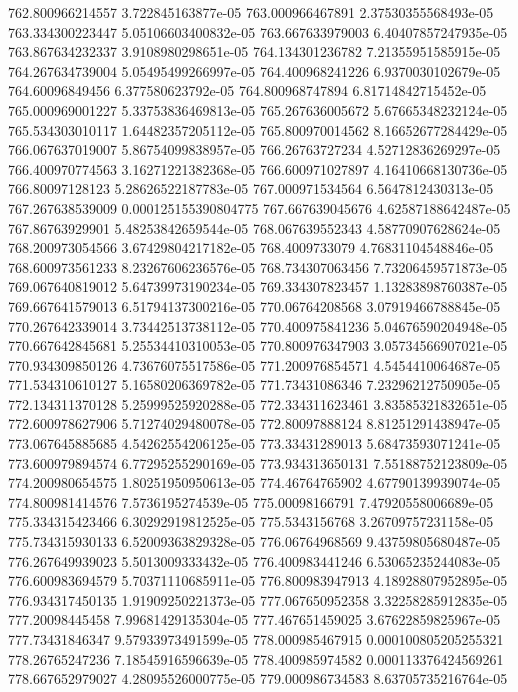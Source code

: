 {762.800966214557 3.722845163877e-05
763.000966467891 2.37530355568493e-05
763.334300223447 5.05106603400832e-05
763.667633979003 6.40407857247935e-05
763.867634232337 3.9108980298651e-05
764.134301236782 7.21355951585915e-05
764.267634739004 5.05495499266997e-05
764.400968241226 6.9370030102679e-05
764.60096849456 6.377580623792e-05
764.800968747894 6.81714842715452e-05
765.000969001227 5.33753836469813e-05
765.267636005672 5.67665348232124e-05
765.534303010117 1.64482357205112e-05
765.800970014562 8.16652677284429e-05
766.067637019007 5.86754099838957e-05
766.26763727234 4.52712836269297e-05
766.400970774563 3.16271221382368e-05
766.600971027897 4.16410668130736e-05
766.80097128123 5.28626522187783e-05
767.000971534564 6.5647812430313e-05
767.267638539009 0.000125155390804775
767.667639045676 4.62587188642487e-05
767.86763929901 5.48253842659544e-05
768.067639552343 4.58770907628624e-05
768.200973054566 3.67429804217182e-05
768.4009733079 4.76831104548846e-05
768.600973561233 8.23267606236576e-05
768.734307063456 7.73206459571873e-05
769.067640819012 5.64739973190234e-05
769.334307823457 1.13283898760387e-05
769.667641579013 6.51794137300216e-05
770.06764208568 3.07919466788845e-05
770.267642339014 3.73442513738112e-05
770.400975841236 5.04676590204948e-05
770.667642845681 5.25534410310053e-05
770.800976347903 3.05734566907021e-05
770.934309850126 4.73676075517586e-05
771.200976854571 4.5454410064687e-05
771.534310610127 5.16580206369782e-05
771.73431086346 7.23296212750905e-05
772.134311370128 5.25999525920288e-05
772.334311623461 3.83585321832651e-05
772.600978627906 5.71274029480078e-05
772.80097888124 8.81251291438947e-05
773.067645885685 4.54262554206125e-05
773.33431289013 5.68473593071241e-05
773.600979894574 6.77295255290169e-05
773.934313650131 7.55188752123809e-05
774.200980654575 1.80251950950613e-05
774.46764765902 4.67790139939074e-05
774.800981414576 7.5736195274539e-05
775.00098166791 7.47920558006689e-05
775.334315423466 6.30292919812525e-05
775.5343156768 3.26709757231158e-05
775.734315930133 6.52009363829328e-05
776.06764968569 9.43759805680487e-05
776.267649939023 5.5013009333432e-05
776.400983441246 6.53065235244083e-05
776.600983694579 5.70371110685911e-05
776.800983947913 4.18928807952895e-05
776.934317450135 1.91909250221373e-05
777.067650952358 3.32258285912835e-05
777.20098445458 7.99681429135304e-05
777.467651459025 3.67622859825967e-05
777.73431846347 9.57933973491599e-05
778.000985467915 0.000100805205255321
778.26765247236 7.18545916596639e-05
778.400985974582 0.000113376424569261
778.667652979027 4.28095526000775e-05
779.000986734583 8.63705735216764e-05
}
